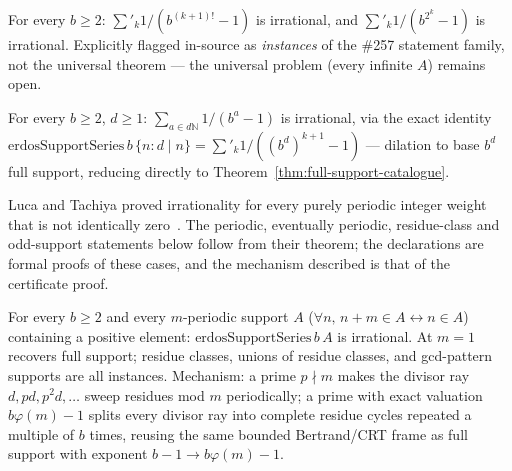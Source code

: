\begin{thm}
\label{thm:factorial-twopow-support}
For every $b\ge 2$: $\sum'_k 1/(b^{(k+1)!}-1)$ is irrational, and $\sum'_k
1/(b^{2^k}-1)$ is irrational. Explicitly flagged in-source as \emph{instances} of the
\#257 statement family, not the universal theorem — the universal problem (every
infinite $A$) remains open.
\par{}
\end{thm}

\begin{thm}
\label{thm:multiples-support}
For every $b\ge 2$, $d\ge 1$: $\sum_{a\in d\mathbb N} 1/(b^a-1)$ is irrational, via the
exact identity $\mathrm{erdosSupportSeries}\,b\,\{n:d\mid n\} = \sum'_k
1/((b^d)^{k+1}-1)$ — dilation to base $b^d$ full support, reducing directly to
Theorem~\ref{thm:full-support-catalogue}.
\par{}
\end{thm}

Luca and Tachiya proved irrationality for every purely periodic integer weight that is not
identically zero~\cite[Theorem~A, p.~139]{lucatachiya2017}.  The periodic, eventually periodic,
residue-class and odd-support statements below follow from their theorem; the declarations are
formal proofs of these cases, and the mechanism described is that of the certificate proof.

\begin{thm}
\label{thm:periodic-support}
For every $b\ge 2$ and every $m$-periodic support $A$ ($\forall n,\, n{+}m\in A
\leftrightarrow n\in A$) containing a positive element: $\mathrm{erdosSupportSeries}\,b\,A$
is irrational. At $m=1$ recovers full support; residue classes, unions of residue
classes, and gcd-pattern supports are all instances. Mechanism: a prime $p\nmid m$ makes
the divisor ray $d,pd,p^2d,\dots$ sweep residues mod $m$ periodically; a prime with exact
valuation $b\varphi(m)-1$ splits every divisor ray into complete residue cycles repeated
a multiple of $b$ times, reusing the same bounded Bertrand/CRT frame as full support with
exponent $b-1\to b\varphi(m)-1$.
\par{}
\end{thm}

